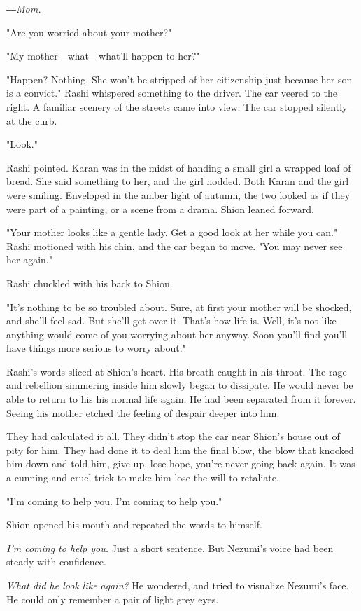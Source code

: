 \emph{―Mom.}

"Are you worried about your mother?"

"My mother―what―what'll happen to her?"

"Happen? Nothing. She won't be stripped of her citizenship just because
her son is a convict." Rashi whispered something to the driver. The car
veered to the right. A familiar scenery of the streets came into view.
The car stopped silently at the curb.

"Look."

Rashi pointed. Karan was in the midst of handing a small girl a wrapped
loaf of bread. She said something to her, and the girl nodded. Both
Karan and the girl were smiling. Enveloped in the amber light of autumn,
the two looked as if they were part of a painting, or a scene from a
drama. Shion leaned forward.

"Your mother looks like a gentle lady. Get a good look at her while you
can." Rashi motioned with his chin, and the car began to move. "You may
never see her again."

Rashi chuckled with his back to Shion.

"It's nothing to be so troubled about. Sure, at first your mother will
be shocked, and she'll feel sad. But she'll get over it. That's how life
is. Well, it's not like anything would come of you worrying about her
anyway. Soon you'll find you'll have things more serious to worry
about."

Rashi's words sliced at Shion's heart. His breath caught in his throat.
The rage and rebellion simmering inside him slowly began to dissipate.
He would never be able to return to his his normal life again. He had
been separated from it forever. Seeing his mother etched the feeling of
despair deeper into him.

They had calculated it all. They didn't stop the car near Shion's house
out of pity for him. They had done it to deal him the final blow, the
blow that knocked him down and told him, give up, lose hope, you're
never going back again. It was a cunning and cruel trick to make him
lose the will to retaliate.

"I'm coming to help you. I'm coming to help you."

Shion opened his mouth and repeated the words to himself.

\emph{I'm coming to help you.} Just a short sentence. But Nezumi's voice had
been steady with confidence.

\emph{What did he look like again?} He wondered, and tried to visualize
Nezumi's face. He could only remember a pair of light grey eyes.


